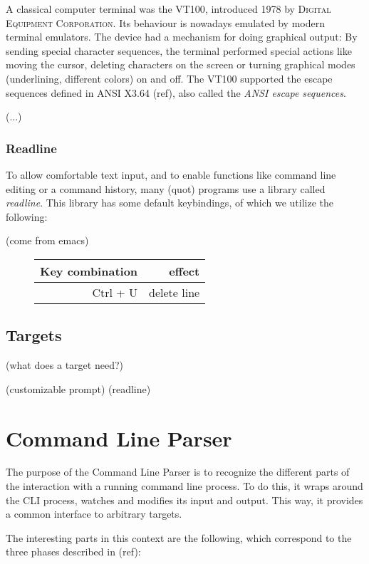 \documentclass[twoside,blue]{tubsreprt}
\begin{document}
A classical computer terminal was the \textsc{VT100}, introduced 1978 by \textsc{Digital Equipment Corporation}. Its behaviour is nowadays emulated by modern terminal emulators. The device had a mechanism for doing graphical output: By sending special character sequences, the terminal performed special actions like moving the cursor, deleting characters on the screen or turning graphical modes (underlining, different colors) on and off. The \textsc{VT100} supported the escape sequences defined in ANSI X3.64 (ref), also called the \emph{ANSI escape sequences}.

(...)

\subsection{Readline}

To allow comfortable text input, and to enable functions like command line editing or a command history, many (quot) programs use a library called \emph{readline}. This library has some default keybindings, of which we utilize the following:

(come from emacs)

\begin{figure}
    \begin{tabular}{r|r}
        Key combination & effect \\
        \hline
        Ctrl + U & delete line \\
    \end{tabular}
\end{figure}

\section{Targets}

(what does a target need?)

(customizable prompt)
(readline)

\chapter{Command Line Parser}

The purpose of the Command Line Parser is to recognize the different parts of the interaction with a running command line process. To do this, it wraps around the \textsc{CLI} process, watches and modifies its input and output. This way, it provides a common interface to arbitrary targets.

The interesting parts in this context are the following, which correspond to the three phases described in (ref):
\end{document}
